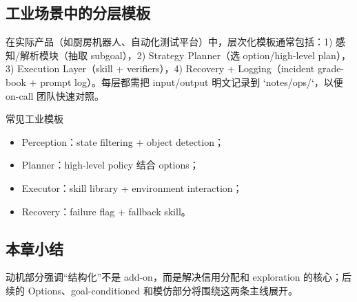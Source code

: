 \subsection{工业场景中的分层模板}

在实际产品（如厨房机器人、自动化测试平台）中，层次化模板通常包括：1) 感知/解析模块（抽取 subgoal），2) Strategy Planner（选 option/high-level plan），3) Execution Layer（skill + verifiers），4) Recovery + Logging（incident grade-book + prompt log）。每层都需把 input/output 明文记录到 `notes/ops/`，以便 on-call 团队快速对照。

\begin{knowledgebox}{常见工业模板}
\begin{itemize}
    \item Perception：state filtering + object detection；
    \item Planner：high-level policy 结合 options；
    \item Executor：skill library + environment interaction；
    \item Recovery：failure flag + fallback skill。
\end{itemize}
\end{knowledgebox}

\subsection{本章小结}

动机部分强调“结构化”不是 add-on，而是解决信用分配和 exploration 的核心；后续的 Options、goal-conditioned 和模仿部分将围绕这两条主线展开。

